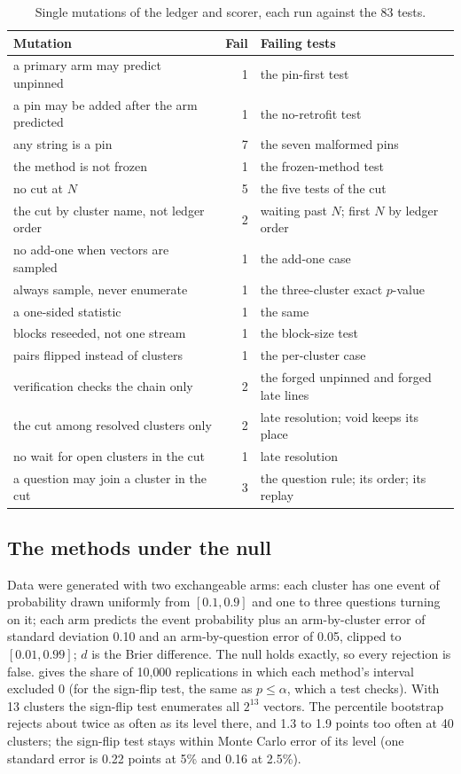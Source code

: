 \documentclass[11pt]{article}
\theoremstyle{plain}
\theoremstyle{definition}
\theoremstyle{remark}
\begin{document}
\begin{table}[ht]
\centering\small
\caption{Single mutations of the ledger and scorer, each run against the 83 tests.}
\label{tab:mutations}
\begin{tabular}{@{}lrl@{}}
\toprule
Mutation & Fail & Failing tests \\
\midrule
a primary arm may predict unpinned & 1 & the pin-first test \\
a pin may be added after the arm predicted & 1 & the no-retrofit test \\
any string is a pin & 7 & the seven malformed pins \\
the method is not frozen & 1 & the frozen-method test \\
no cut at $N$ & 5 & the five tests of the cut \\
the cut by cluster name, not ledger order & 2 & waiting past $N$; first $N$ by ledger order \\
no add-one when vectors are sampled & 1 & the add-one case \\
always sample, never enumerate & 1 & the three-cluster exact $p$-value \\
a one-sided statistic & 1 & the same \\
blocks reseeded, not one stream & 1 & the block-size test \\
pairs flipped instead of clusters & 1 & the per-cluster case \\
verification checks the chain only & 2 & the forged unpinned and forged late lines \\
the cut among resolved clusters only & 2 & late resolution; void keeps its place \\
no wait for open clusters in the cut & 1 & late resolution \\
a question may join a cluster in the cut & 3 & the question rule; its order; its replay \\
\bottomrule
\end{tabular}
\end{table}

\subsection{The methods under the null}
Data were generated with two exchangeable arms: each cluster has one event of probability drawn
uniformly from $[0.1, 0.9]$ and one to three questions turning on it; each arm predicts the event
probability plus an arm-by-cluster error of standard deviation 0.10 and an arm-by-question error of
0.05, clipped to $[0.01, 0.99]$; $d$ is the Brier difference. The null holds exactly, so every
rejection is false.  gives the share of 10{,}000 replications in which each method's
interval excluded 0 (for the sign-flip test, the same as $p \le \alpha$, which a test checks). With
13 clusters the sign-flip test enumerates all $2^{13}$ vectors. The percentile bootstrap rejects
about twice as often as its level there, and 1.3 to 1.9 points too often at 40 clusters; the
sign-flip test stays within Monte Carlo error of its level (one standard error is 0.22 points at
5\% and 0.16 at 2.5\%).
\end{document}

